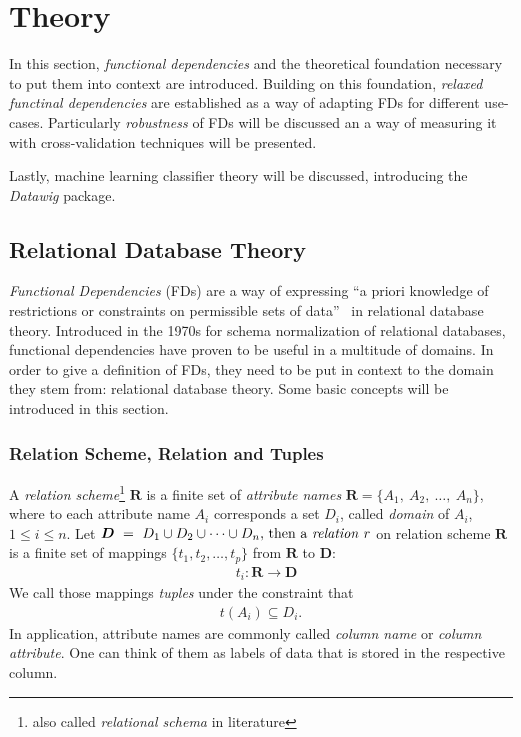 \newpage
\section{Theory}

In this section, \emph{functional dependencies} and the theoretical foundation necessary to put them into context are introduced.
Building on this foundation, \emph{relaxed functinal dependencies} are established as a way of adapting FDs for different use-cases.
Particularly \emph{robustness} of FDs will be discussed an a way of measuring it with cross-validation techniques will be presented.

Lastly, machine learning classifier theory will be discussed, introducing the \emph{Datawig} package.

\subsection{Relational Database Theory}
\emph{Functional Dependencies} (FDs) are a way of expressing ``a priori knowledge of restrictions or constraints on permissible sets of data''~\cite[p.~42]{MAI83} in relational database theory.
Introduced in the 1970s for schema normalization of relational databases, functional dependencies have proven to be useful in a multitude of domains.
In order to give a definition of FDs, they need to be put in context to the domain they stem from: relational database theory.
Some basic concepts will be introduced in this section.

\subsubsection{Relation Scheme, Relation and Tuples}
A \emph{relation scheme}\footnote{also called \emph{relational schema} in literature\cite[p.21]{ABE19} } \(\boldsymbol{R}\) is a finite set of \emph{attribute names} \( \boldsymbol{R} = \{A_1,~A_2,~\dots,~A_n\}\), where to each attribute name \(A_i\) corresponds a set \(D_i\), called \emph{domain} of \(A_i\), \(1 \leq i \leq n\).
Let \(\boldsymbol{D}~=~D_1 \cup D_2 \cup \dots \cup D_n$, then a \emph{relation} \(r\) on relation scheme \(\boldsymbol{R}\) is a finite set of mappings \(\{t_1, t_2, \dots, t_p\}\) from \(\boldsymbol{R}\) to \(\boldsymbol{D}\):
\begin{align*}
  &t_i: \boldsymbol{R} \to \boldsymbol{D}
\end{align*}
We call those mappings \emph{tuples} under the constraint that~\cite[p.2]{MAI83}
\begin{align*}
    t(A_i) \subseteq D_i.
\end{align*}
In application, attribute names are commonly called \emph{column name} or \emph{column attribute}.
One can think of them as labels of data that is stored in the respective column.


